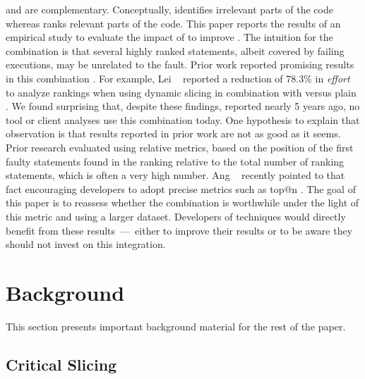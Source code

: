 \documentclass[sigplan,10pt,review,anonymous]{acmart}\settopmatter{printfolios=true,printccs=false,printacmref=false}
\begin{document}
\ds{} and \sfl{} are complementary. Conceptually, \ds{} identifies
irrelevant parts of the code whereas \sfl{} ranks relevant parts of
the code.  This paper reports the results of an empirical study to
evaluate the impact of \ds{} to improve \sfl{}. The intuition for the
\comb{} combination is that several highly ranked statements, albeit
covered by failing executions, may be unrelated to the fault. Prior
work reported promising results in this combination
\cite{Wotawa:2010:FLB:1848650.1849235,Alves:2011:FUD:2190078.2190115,DBLP:conf/ecai/HoferW12,lei-mao-dai-wang-2012}.
For example, Lei \etal{}~\cite{lei-mao-dai-wang-2012} reported a
reduction of 78.3\% in \emph{effort}~\cite{7927959} to analyze
rankings when using dynamic slicing in combination with \sfl{} versus
plain \sfl{}. We found surprising that, despite these findings,
reported nearly 5 years ago, no tool or client analyses use this
combination today. One hypothesis to explain that observation is that
results reported in prior work are not as good as it seems. Prior
research evaluated \sfl{} using relative metrics, based on the
position of the first faulty statements found in the ranking relative
to the total number of ranking statements, which is often a very high
number. Ang \etal~\cite{ang-perez-van-deursen-rui-2017} recently
pointed to that fact encouraging developers to adopt precise metrics
such as top@n
\cite{Wu:2014:CLC:2610384.2610386,Lucia:2014:FFL:2642937.2642983,Wen:2016:LLB:2970276.2970359}. The
goal of this paper is to reassess whether the \comb{} combination is
worthwhile under the light of this metric and using a larger
dataset. Developers of \acrAbrev{} techniques would directly benefit
from these results~---~either to improve their results or to be aware
they should not invest on this integration.



\section{Background}
\label{sec:background}

This section presents important background material for the rest of the paper.

\subsection{Critical Slicing}
\label{sec:slicing}
\end{document}
